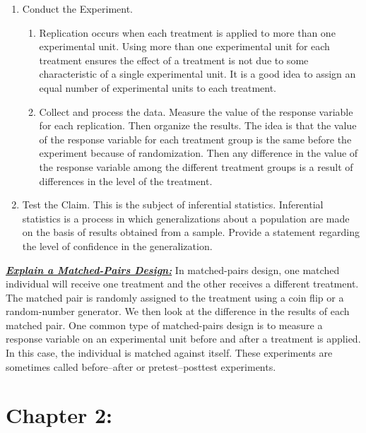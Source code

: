 \documentclass{report}
\begin{document}
\begin{enumerate}
\begin{enumerate}
                \end{enumerate}
            \item Conduct the Experiment.
                \begin{enumerate}[label=\alph*.)]
                    \item Replication occurs when each treatment is applied to more than one experimental unit. Using more than one experimental unit for each treatment ensures the effect of a treatment is not due to some characteristic of a single experimental unit. It is a good idea to assign an equal number of experimental units to each treatment.
                    \item Collect and process the data. Measure the value of the response variable for each replication. Then organize the results. The idea is that the value of the response variable for each treatment group is the same before the experiment because of randomization. Then any difference in the value of the response variable among the different treatment groups is a result of differences in the level of the treatment.
                \end{enumerate}
            \item Test the Claim. This is the subject of inferential statistics. Inferential statistics is a process in which generalizations about a population are made on the basis of results obtained from a sample. Provide a statement regarding the level of confidence in the generalization.
        \end{enumerate}

        \bigbreak \noindent 
        \textbf{\textit{\underline{Explain a Matched-Pairs Design:}}}
        \bigbreak \noindent 
        In matched-pairs design, one matched individual will receive one treatment and the other receives a different treatment. The matched pair is randomly assigned to the treatment using a coin flip or a random-number generator. We then look at the difference in the results of each matched pair. One common type of matched-pairs design is to measure a response variable on an experimental unit before and after a treatment is applied. In this case, the individual is matched against itself. These experiments are sometimes called before–after or pretest–posttest experiments.

        \pagebreak \bigbreak \noindent
        \section{Chapter 2:}
        \bigbreak \noindent 
\end{document}
